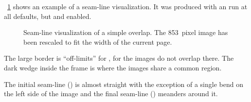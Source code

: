 %
%
\figureName~\ref{fig:seam-line-visualization} shows an example of a seam-line visualization.  It
was produced with an \App{} run at all defaults, but  and
 enabled.

\begin{figure}[htbp]
  \begin{maxipage}
    \centering
  \end{maxipage}

  \caption[Seam-line visualization]{\label{fig:seam-line-visualization}%
    Seam-line visualization of a simple overlap.  \ifhevea \relax\else The
    853~pixel image has been rescaled to fit the width of the current page.\fi}
\end{figure}

The large  border is ``off-limits'' for \App, for the
images do not overlap there.  The dark wedge inside the
 frame is where the images share a common region.

The initial seam-line () is almost straight with the
exception of a single bend on the left side of the image and the final seam-line
() meanders around it.


